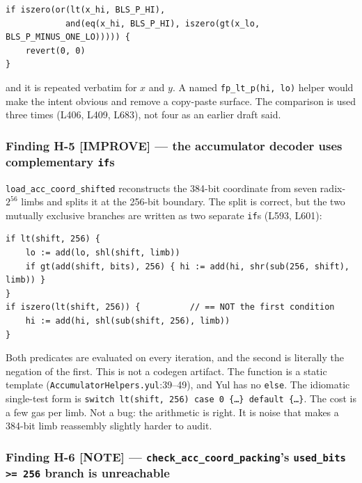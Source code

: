 \begin{lstlisting}[style=yul]
if iszero(or(lt(x_hi, BLS_P_HI),
            and(eq(x_hi, BLS_P_HI), iszero(gt(x_lo, BLS_P_MINUS_ONE_LO))))) {
    revert(0, 0)
}
\end{lstlisting}

and it is repeated verbatim for $x$ and $y$. A named
\texttt{fp\_lt\_p(hi, lo)} helper would make the intent obvious and
remove a copy-paste surface. The comparison is used three times
(L406, L409, L683), not four as an earlier draft said.

\subsubsection*{Finding H-5 \textcolor{codegenblue}{[IMPROVE]} --- the accumulator decoder uses complementary \texttt{if}s}

\texttt{load\_\allowbreak{}acc\_\allowbreak{}coord\_\allowbreak{}shifted} reconstructs the 384-bit
coordinate from seven radix-$2^{56}$ limbs and splits it at the
256-bit boundary. The split is correct, but the two mutually
exclusive branches are written as two separate \texttt{if}s
(L593, L601):

\begin{lstlisting}[style=yul]
if lt(shift, 256) {
    lo := add(lo, shl(shift, limb))
    if gt(add(shift, bits), 256) { hi := add(hi, shr(sub(256, shift), limb)) }
}
if iszero(lt(shift, 256)) {          // == NOT the first condition
    hi := add(hi, shl(sub(shift, 256), limb))
}
\end{lstlisting}

Both predicates are evaluated on every iteration, and the second is
literally the negation of the first.  This is not
a codegen artifact. The function is a static template
(\texttt{AccumulatorHelpers.yul}:39--49), and Yul has no
\texttt{else}. The idiomatic single-test form is
\texttt{switch lt(shift, 256) case 0 \{\ldots\} default \{\ldots\}}.
The cost is a few gas per limb. Not a bug: the arithmetic is right.
It is noise that makes a 384-bit limb reassembly slightly harder to
audit. 

\subsubsection*{Finding H-6 \textcolor{mathpurple}{[NOTE]} --- \texttt{check\_\allowbreak{}acc\_\allowbreak{}coord\_\allowbreak{}packing}'s \texttt{used\_bits >= 256} branch is unreachable}

